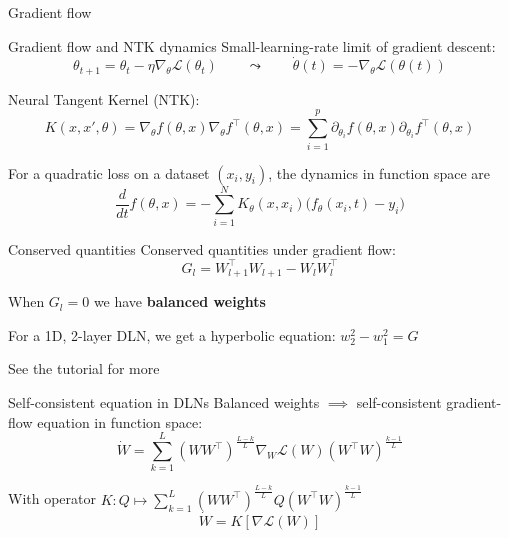 \documentclass[aspectratio=169]{beamer}
\newcommand{\sectionframe}[1]{%
  \begin{frame}[plain]
    \centering
    \vfill
    {\Huge #1}
    \vfill
  \end{frame}
}
\begin{document}
\sectionframe{Gradient flow}

\begin{frame}{Gradient flow and NTK dynamics}
  \small
  Small-learning-rate limit of gradient descent:
  \[
    \theta_{t+1}=\theta_t-\eta \nabla_\theta \mathcal{L}(\theta_t)
    \qquad \leadsto \qquad
    \dot{\theta}(t)=-\nabla_\theta \mathcal{L}(\theta(t))
  \]

  Neural Tangent Kernel (NTK):
  \[
    K(x,x',\theta) =
    \nabla_{\theta} f(\theta, x) \nabla_{\theta} f^{\top}(\theta, x) =
    \sum_{i=1}^p \partial_{\theta_i} f(\theta, x) \partial_{\theta_i} f^{\top}(\theta, x)
  \]

  For a quadratic loss on a dataset $(x_i,y_i)$, the dynamics in function space are
  \[
    \frac{d}{dt}f(\theta, x)
    = -\sum_{i=1}^N K_{\theta}(x,x_i)\big(f_{\theta}(x_i,t)-y_i\big)
  \]
\end{frame}

\begin{frame}{Conserved quantities}
  Conserved quantities under gradient flow:
  \[
    G_l = W_{l+1}^{\top}W_{l+1} - W_{l}W_{l}^{\top}
  \]

  When $G_l=0$ we have \textbf{balanced weights}

  \vspace{0.4cm}

  For a 1D, 2-layer DLN, we get a hyperbolic equation: $w_2^2 - w_1^2 = G$

  \vspace{0.4cm}

  See the tutorial for more
\end{frame}

\begin{frame}{Self-consistent equation in DLNs}
  \small
  Balanced weights $\implies$ self-consistent gradient-flow equation in function space:
  \[
    \dot{W} =
    \sum_{k=1}^{L}(WW^{\top})^{\frac{L-k}{L}}\nabla_W \mathcal{L}(W)(W^{\top}W)^{\frac{k-1}{L}}
  \]

  With operator $K: Q \mapsto \sum_{k=1}^{L}(WW^{\top})^{\frac{L-k}{L}} Q(W^{\top}W)^{\frac{k-1}{L}}$
  \[
    \dot{W} = K[\nabla\mathcal{L}(W)]
  \]
\end{frame}
\end{document}
